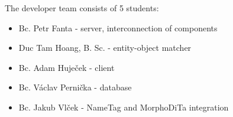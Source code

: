 The developer team consists of 5 students:

\begin{itemize}
\itemsep0em
\item Bc. Petr Fanta - server, interconnection of components
\item Duc Tam Hoang, B. Sc. - entity-object matcher 
\item Bc. Adam Huječek - client
\item Bc. Václav Pernička - database
\item Bc. Jakub Vlček - NameTag and MorphoDiTa integration
\end{itemize}
